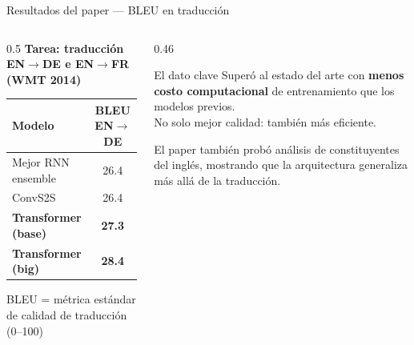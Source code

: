 \documentclass[aspectratio=169, 10pt]{beamer}
\newcommand{\highlight}[1]{\textcolor{fenred}{\textbf{#1}}}
\newcommand{\concept}[1]{\textcolor{fenblue}{\textbf{#1}}}
\begin{document}
\begin{frame}{Resultados del paper --- BLEU en traducción}

  \begin{columns}[T]
    \begin{column}{0.5\textwidth}
      \textbf{Tarea: traducción EN$\to$DE e EN$\to$FR (WMT 2014)}

      \vspace{0.4em}
      \begin{tabular}{lc}
        \toprule
        \textbf{Modelo} & \textbf{BLEU EN$\to$DE} \\
        \midrule
        Mejor RNN ensemble & 26.4 \\
        ConvS2S & 26.4 \\
        \concept{Transformer (base)} & \concept{27.3} \\
        \highlight{Transformer (big)} & \highlight{28.4} \\
        \bottomrule
      \end{tabular}

      \vspace{0.4em}
      {\small BLEU = métrica estándar de calidad de traducción (0--100)}
    \end{column}
    \begin{column}{0.46\textwidth}
      \begin{alertblock}{El dato clave}
        Superó al estado del arte con \textbf{menos costo computacional} de entrenamiento que los modelos previos.\\[0.3em]
        No solo mejor calidad: también más eficiente.
      \end{alertblock}
      \vspace{0.3em}
      El paper también probó análisis de constituyentes del inglés, mostrando que la arquitectura generaliza más allá de la traducción.
    \end{column}
  \end{columns}

\end{frame}

\end{document}
